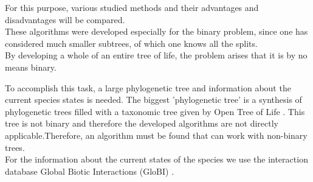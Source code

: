   For this purpose, various studied methods and their advantages and disadvantages will be compared. \\
  These algorithms were developed especially for the binary problem, since one has considered much 
    smaller subtrees, of which one knows all the splits. \\
  By developing a whole of an entire tree of life, the problem arises that it is by no means binary. 

  To accomplish this task, a large phylogenetic tree and information about the current species states 
    is needed. %
  The biggest 'phylogenetic tree' is a synthesis of phylogenetic trees filled with a taxonomic tree 
    given by Open Tree of Life \cite{Hinchliff2015}. This tree is not binary and therefore the 
    developed algorithms are not directly applicable.Therefore, an algorithm must be found that can 
    work with non-binary trees. \\
  For the information about the current states of the species we use the interaction database Global 
    Biotic Interactions (GloBI) \cite{Poelen2014}.


